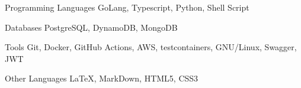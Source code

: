 
\begin{cvskills}
  \cvskill
  {Programming Languages}
  {GoLang, Typescript, Python, Shell Script}

  \cvskill
  {Databases}
  {PostgreSQL, DynamoDB, MongoDB}

  \cvskill
  {Tools}
  {Git, Docker, GitHub Actions, AWS, testcontainers, GNU/Linux, Swagger, JWT}


  \cvskill
  {Other Languages}
  {LaTeX, MarkDown, HTML5, CSS3}
\end{cvskills}
